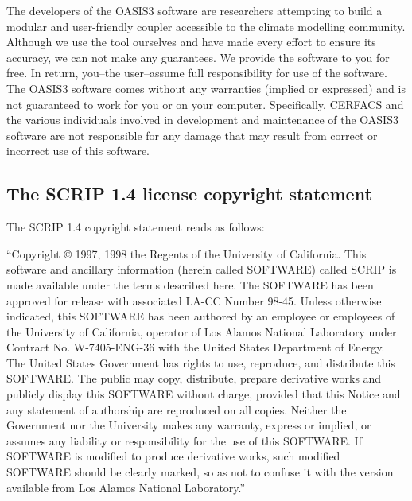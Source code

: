 The developers of the OASIS3 software are researchers attempting to
build a modular and user-friendly coupler accessible to the climate
modelling community. Although we use the tool ourselves and have made
every effort to ensure its accuracy, we can not make any
guarantees. We provide the software to you for free. In return,
you--the user--assume full responsibility for use of the software. The
OASIS3 software comes without any warranties (implied or expressed) and
is not guaranteed to work for you or on your computer. Specifically,
CERFACS and the various individuals involved in development and
maintenance of the OASIS3 software are not responsible for any damage
that may result from correct or incorrect use of this software.

\subsection{The SCRIP 1.4 license copyright statement}
\label{sec_SCRIP}

The SCRIP 1.4 copyright statement reads as follows:

 ``Copyright © 1997, 1998 the Regents of the
University of California.  This software and ancillary information
(herein called SOFTWARE) called SCRIP is made available under the
terms described here. The SOFTWARE has been approved for release with
associated LA-CC Number 98-45. Unless otherwise indicated, this
SOFTWARE has been authored by an employee or employees of the
University of California, operator of Los Alamos National Laboratory
under Contract No. W-7405-ENG-36 with the United States Department of
Energy. The United States Government has rights to use, reproduce, and
distribute this SOFTWARE. The public may copy, distribute, prepare
derivative works and publicly display this SOFTWARE without charge,
provided that this Notice and any statement of authorship are
reproduced on all copies. Neither the Government nor the University
makes any warranty, express or implied, or assumes any liability or
responsibility for the use of this SOFTWARE. If SOFTWARE is modified
to produce derivative works, such modified SOFTWARE should be clearly
marked, so as not to confuse it with the version available from Los
Alamos National Laboratory.''
